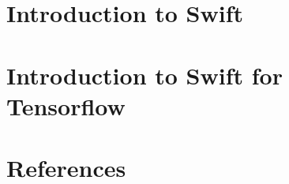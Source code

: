 \section[Swift]{Introduction to Swift}


\section[s4ft]{Introduction to Swift for Tensorflow}


 \section[Refs]{References}


